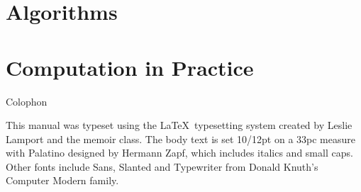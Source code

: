 \documentclass[letterpaper,10pt,extrafontsizesmtwoside,onecolumn,openright,fleqn]{memoir}
\begin{document}
\part{Algorithms}










\part{Computation in Practice}







\backmatter

\cleardoublepage
{}
{}
\printindex

\cleardoublepage
\pagestyle{empty}
\null\vfil

\begin{adjustwidth}{1in}{1in}
\begin{center}
{\Large\textsf{Colophon}}
\end{center}
\begin{center}
This manual was typeset using the \LaTeX\ typesetting system
created by Leslie Lamport and the memoir class.
The body text is set 10/12pt on a
33pc measure with Palatino designed by Hermann Zapf, which includes
italics and small caps. Other fonts include
Sans, Slanted and Typewriter from Donald Knuth's
Computer Modern family.

\end{center}

\end{adjustwidth}

\vfil
\end{document}
